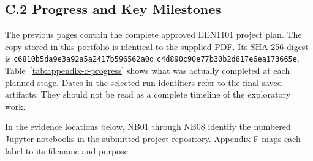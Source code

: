 \providecommand{\PortfolioImportedPageCommand}{}
\providecommand{\PortfolioAppendixPageStyle}{}
\providecommand{\PortfolioContentPageCommand}{}



\onecolumn
\PortfolioAppendixPageStyle
\PortfolioContentPageCommand
{}
{}
\subsection*{C.2 Progress and Key Milestones}
\label{app:c-progress}

The previous pages contain the complete approved EEN1101 project plan. The copy stored
in this portfolio is identical to the supplied PDF. Its SHA-256 digest is
\texttt{c6810b5da9e3a92a5a2417b596562a0d}\allowbreak
\texttt{c4d890c90e77b30b2d617e6ea173665e}.
Table~\ref{tab:appendix-c-progress} shows what was actually completed at each
planned stage. Dates in the selected run identifiers refer to the final saved
artifacts. They should not be read as a complete timeline of the exploratory
work.

In the evidence locations below, NB01 through NB08 identify the numbered
Jupyter notebooks in the submitted project repository. Appendix F maps each
label to its filename and purpose.

